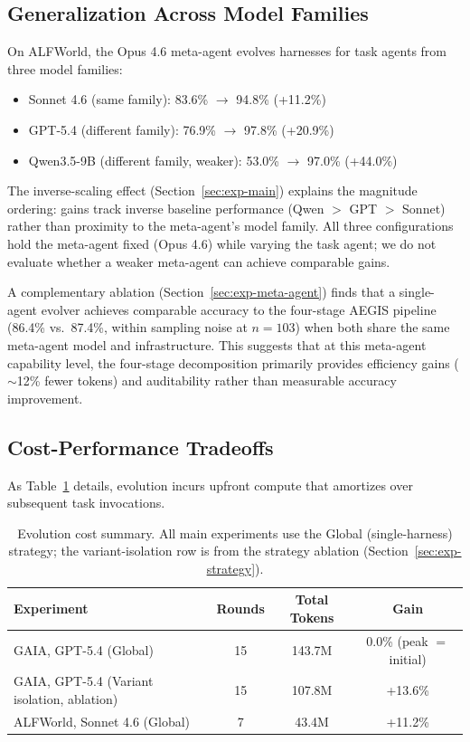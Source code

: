 \subsection{Generalization Across Model Families}

On ALFWorld, the Opus 4.6 meta-agent evolves harnesses for task agents from three model families:
\begin{itemize}
  \item Sonnet 4.6 (same family): 83.6\% $\to$ 94.8\% (+11.2\%)
  \item GPT-5.4 (different family): 76.9\% $\to$ 97.8\% (+20.9\%)
  \item Qwen3.5-9B (different family, weaker): 53.0\% $\to$ 97.0\% (+44.0\%)
\end{itemize}
The inverse-scaling effect (Section~\ref{sec:exp-main}) explains the magnitude ordering: gains track inverse baseline performance (Qwen $>$ GPT $>$ Sonnet) rather than proximity to the meta-agent's model family. All three configurations hold the meta-agent fixed (Opus 4.6) while varying the task agent; we do not evaluate whether a weaker meta-agent can achieve comparable gains.

A complementary ablation (Section~\ref{sec:exp-meta-agent}) finds that a single-agent evolver achieves comparable accuracy to the four-stage AEGIS pipeline (86.4\% vs.\ 87.4\%, within sampling noise at $n{=}103$) when both share the same meta-agent model and infrastructure. This suggests that at this meta-agent capability level, the four-stage decomposition primarily provides efficiency gains (${\sim}$12\% fewer tokens) and auditability rather than measurable accuracy improvement.

\subsection{Cost-Performance Tradeoffs}

As Table~\ref{tab:cost-summary} details, evolution incurs upfront compute that amortizes over subsequent task invocations.

\begin{table}[!htbp]
\centering
\small
\caption{Evolution cost summary. All main experiments use the Global (single-harness) strategy; the variant-isolation row is from the strategy ablation (Section~\ref{sec:exp-strategy}).}
\label{tab:cost-summary}
\begin{tabular}{lccc}
\toprule
\textbf{Experiment} & \textbf{Rounds} & \textbf{Total Tokens} & \textbf{Gain} \\
\midrule
GAIA, GPT-5.4 (Global)             & 15 & 143.7M & 0.0\% (peak $=$ initial) \\
GAIA, GPT-5.4 (Variant isolation, ablation) & 15 & 107.8M & +13.6\% \\
ALFWorld, Sonnet 4.6 (Global)       & 7  & 43.4M  & +11.2\% \\
\bottomrule
\end{tabular}
\end{table}




